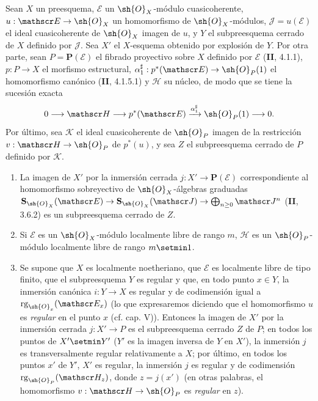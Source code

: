 \begin{proposition}[19.4.11]
\label{IV.19.4.11}
Sean $X$ un preesquema, $\mathscr E$ un $\sh{O}_X$-módulo cuasicoherente, $u:\mathscr E\to\sh{O}_X$ un homomorfismo de $\sh{O}_X$-módulos, $\mathscr J=u(\mathscr E)$ el ideal cuasicoherente de $\sh{O}_X$ imagen de $u$, y $Y$ el subpreesquema cerrado de $X$ definido por $\mathscr J$. Sea $X'$ el $X$-esquema obtenido por explosión de $Y$. Por otra parte, sean $P=\mathbf P(\mathscr E)$ el fibrado proyectivo sobre $X$ definido por $\mathscr E$ \textup{(\textbf{II}, 4.1.1)}, $p:P\to X$ el morfismo estructural, $\alpha_1^{\sharp}:p^*(\mathscr E)\to\sh{O}_P(1)$ el homomorfismo canónico \textup{(\textbf{II}, 4.1.5.1)} y $\mathscr H$ su núcleo, de modo que se tiene la sucesión exacta
\[
  0\longrightarrow\mathscr H\longrightarrow p^*(\mathscr E)\xrightarrow{\alpha_1^{\sharp}}\sh{O}_P(1)\longrightarrow0.
\]
Por último, sea $\mathscr K$ el ideal cuasicoherente de $\sh{O}_P$ imagen de la restricción $v:\mathscr H\to\sh{O}_P$ de $p^*(u)$, y sea $Z$ el subpreesquema cerrado de $P$ definido por $\mathscr K$.


\begin{enumerate}
  \item[\textup{(i)}] La imagen de $X'$ por la inmersión cerrada $j:X'\to\mathbf P(\mathscr E)$ correspondiente al homomorfismo sobreyectivo de $\sh{O}_X$-álgebras graduadas $\mathbf S_{\sh{O}_X}(\mathscr E)\to\mathbf S_{\sh{O}_X}(\mathscr J)\to\bigoplus_{n\geq0}\mathscr J^n$ \textup{(\textbf{II}, 3.6.2)} es un subpreesquema cerrado de $Z$.
  \item[\textup{(ii)}] Si $\mathscr E$ es un $\sh{O}_X$-módulo localmente libre de rango $m$, $\mathscr H$ es un $\sh{O}_P$-módulo localmente libre de rango $m\setmin 1$.
  \item[\textup{(iii)}] Se supone que $X$ es localmente noetheriano, que $\mathscr E$ es localmente libre de tipo finito, que el subpreesquema $Y$ es regular y que, en todo punto $x\in Y$, la inmersión canónica $i:Y\to X$ es regular y de codimensión igual a $\operatorname{rg}_{\sh{O}_x}(\mathscr E_x)$ \textup{(lo que expresaremos diciendo que el homomorfismo $u$ es \emph{regular} en el punto $x$ (cf. cap. V))}. Entonces la imagen de $X'$ por la inmersión cerrada $j:X'\to P$ es el subpreesquema cerrado $Z$ de $P$; en todos los puntos de $X'\setmin Y'$ \textup{(}$Y'$ es la imagen inversa de $Y$ en $X'$\textup{)}, la inmersión $j$ es transversalmente regular relativamente a $X$; por último, en todos los puntos $x'$ de $Y'$, $X'$ es regular, la inmersión $j$ es regular y de codimensión $\operatorname{rg}_{\sh{O}_P}(\mathscr H_z)$, donde $z=j(x')$ \textup{(en otras palabras, el homomorfismo $v:\mathscr H\to\sh{O}_P$ es \emph{regular} en $z$)}.
\end{enumerate}
\end{proposition}


